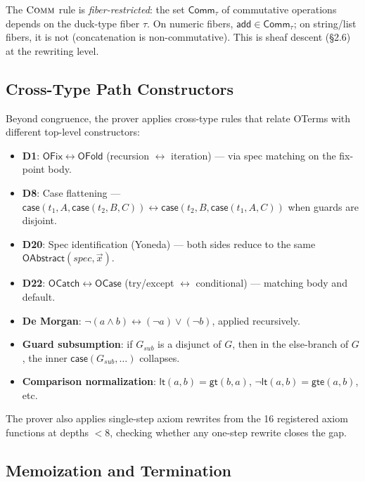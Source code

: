 \documentclass[11pt,a4paper]{report}
\theoremstyle{definition}
\theoremstyle{plain}
\begin{document}
The $\textsc{Comm}$ rule is \emph{fiber-restricted}: the set
$\mathsf{Comm}_\tau$ of commutative operations depends on the duck-type
fiber $\tau$.  On numeric fibers, $\mathsf{add} \in \mathsf{Comm}_\tau$;
on string/list fibers, it is not (concatenation is non-commutative).
This is sheaf descent (\S2.6) at the rewriting level.

\subsection{Cross-Type Path Constructors}

Beyond congruence, the prover applies cross-type rules that relate
OTerms with different top-level constructors:

\begin{itemize}
  \item \textbf{D1}: $\mathsf{OFix} \leftrightarrow \mathsf{OFold}$
    (recursion $\leftrightarrow$ iteration) --- via spec matching
    on the fix-point body.
  \item \textbf{D8}: Case flattening ---
    $\mathsf{case}(t_1, A, \mathsf{case}(t_2, B, C))
    \leftrightarrow \mathsf{case}(t_2, B, \mathsf{case}(t_1, A, C))$
    when guards are disjoint.
  \item \textbf{D20}: Spec identification (Yoneda) --- both sides
    reduce to the same $\mathsf{OAbstract}(\mathit{spec}, \vec{x})$.
  \item \textbf{D22}: $\mathsf{OCatch} \leftrightarrow \mathsf{OCase}$
    (try/except $\leftrightarrow$ conditional) --- matching body and
    default.
  \item \textbf{De Morgan}:
    $\lnot(a \land b) \leftrightarrow (\lnot a) \lor (\lnot b)$,
    applied recursively.
  \item \textbf{Guard subsumption}:
    if $G_{\mathit{sub}}$ is a disjunct of $G$, then in the
    else-branch of $G$, the inner
    $\mathsf{case}(G_{\mathit{sub}}, \ldots)$ collapses.
  \item \textbf{Comparison normalization}:
    $\mathsf{lt}(a,b) = \mathsf{gt}(b,a)$,
    $\lnot\mathsf{lt}(a,b) = \mathsf{gte}(a,b)$, etc.
\end{itemize}

The prover also applies single-step axiom rewrites from the
16 registered axiom functions at depths $< 8$, checking whether
any one-step rewrite closes the gap.

\subsection{Memoization and Termination}
\end{document}
